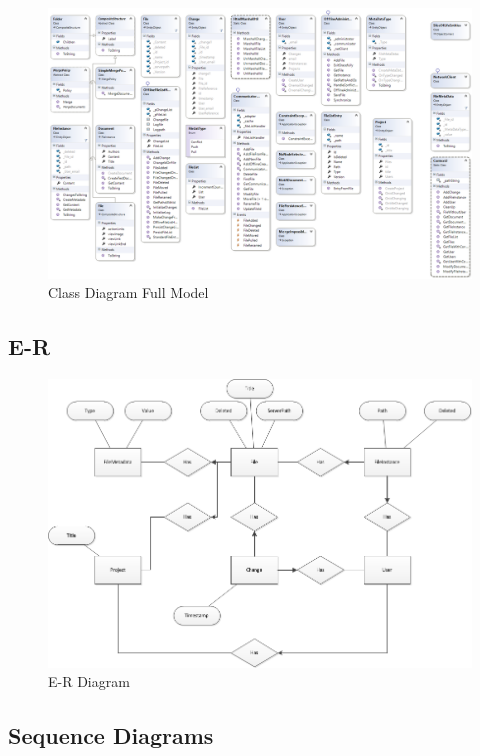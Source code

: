 \begin{figure}[H]
  \includegraphics[width=\textwidth]{illustrations/classDiagrams/FullModel.png}
  \caption{Class Diagram Full Model}
\end{figure}
\subsection{E-R}
\begin{figure}[H]
  \includegraphics[width=\textwidth]{illustrations/E-R.png}
  \caption{E-R Diagram}
  \label{erdiagram}
\end{figure}
\subsection{Sequence Diagrams}
